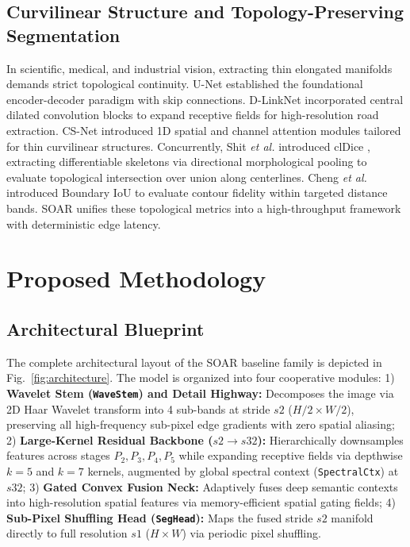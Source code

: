 \documentclass[11pt,a4paper]{article}
\begin{document}
\subsection{Curvilinear Structure and Topology-Preserving Segmentation}
In scientific, medical, and industrial vision, extracting thin elongated manifolds demands strict topological continuity. U-Net \cite{ronneberger2015u} established the foundational encoder-decoder paradigm with skip connections. D-LinkNet \cite{zhou2018dlinknet} incorporated central dilated convolution blocks to expand receptive fields for high-resolution road extraction. CS-Net \cite{mou2019csnet} introduced 1D spatial and channel attention modules tailored for thin curvilinear structures. 
Concurrently, Shit \emph{et al.} introduced clDice \cite{shit2021cldice}, extracting differentiable skeletons via directional morphological pooling to evaluate topological intersection over union along centerlines. Cheng \emph{et al.} introduced Boundary IoU \cite{cheng2021boundary} to evaluate contour fidelity within targeted distance bands. SOAR unifies these topological metrics into a high-throughput framework with deterministic edge latency.

\section{Proposed Methodology}

\subsection{Architectural Blueprint}
The complete architectural layout of the SOAR baseline family is depicted in Fig.~\ref{fig:architecture}. The model is organized into four cooperative modules:
1) \textbf{Wavelet Stem (\texttt{WaveStem}) and Detail Highway:} Decomposes the image via 2D Haar Wavelet transform into 4 sub-bands at stride $s2$ ($H/2 \times W/2$), preserving all high-frequency sub-pixel edge gradients with zero spatial aliasing;
2) \textbf{Large-Kernel Residual Backbone ($s2 \to s32$):} Hierarchically downsamples features across stages $P_2, P_3, P_4, P_5$ while expanding receptive fields via depthwise $k=5$ and $k=7$ kernels, augmented by global spectral context (\texttt{SpectralCtx}) at $s32$;
3) \textbf{Gated Convex Fusion Neck:} Adaptively fuses deep semantic contexts into high-resolution spatial features via memory-efficient spatial gating fields;
4) \textbf{Sub-Pixel Shuffling Head (\texttt{SegHead}):} Maps the fused stride $s2$ manifold directly to full resolution $s1$ ($H \times W$) via periodic pixel shuffling.
\end{document}
